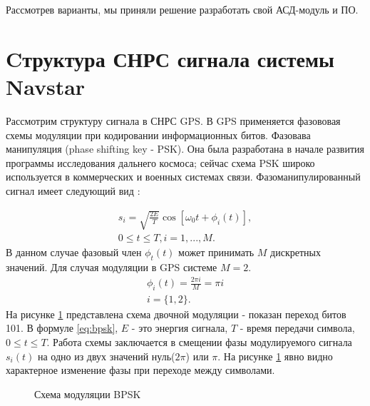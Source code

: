 \documentclass[a4paper,12pt]{article}
\numberwithin{table}{section}
\begin{document}
Рассмотрев варианты, мы приняли решение разработать свой АСД-модуль и ПО.

\section{Cтруктура СНРС сигнала системы Navstar}

Рассмотрим структуру сигнала в СНРС GPS. В GPS применяется фазововая схемы модуляции при кодировании информационных битов.
Фазовава манипуляция (phase shifting key - PSK).  Она была разработана  в начале развития программы исследования дальнего космоса;
сейчас схема PSK широко используется в коммерческих и военных системах связи. Фазоманипулированный сигнал имеет следующий вид \cite{sklyar}:

\begin{eqnarray}
s_i=\sqrt{\frac{2E}{T}}\cos{[{{\omega}_0}t + \phi_i(t)]}, \nonumber \\
	0\leq{t}\leq{T}, i = 1, ..., M.
\label{eq:bpsk}
\end{eqnarray}
В данном случае фазовый член ${\phi_t(t)}$ может принимать ${M}$ дискретных значений. Для случая модуляции в GPS системе ${M=2}$.
\begin{eqnarray}
	\phi_i(t)=\frac{2\pi{i}}{M}=\pi{i} \nonumber \\
	i = \{1,2\}.
\label{eq:bpsk_phi}
\end{eqnarray}
На рисунке \ref{pic:bpsk} представлена схема двочной модуляции - показан переход битов 101. В формуле \ref{eq:bpsk}, ${E}$ - это энергия
сигнала, ${T}$ - время передачи символа, ${0\leq{t}\leq{T}}$. Работа схемы заключается в смещении фазы модулируемого сигнала
${s_i(t)}$ на одно из двух значений нуль(${2\pi}$) или ${\pi}$. На рисунке \ref{pic:bpsk} явно видно характерное изменение фазы при 
переходе между символами.

\begin{figure}[h]
\begin{center}
\end{center}
\caption{Схема модуляции BPSK}
\label{pic:bpsk}
\end{figure}
\end{document}
